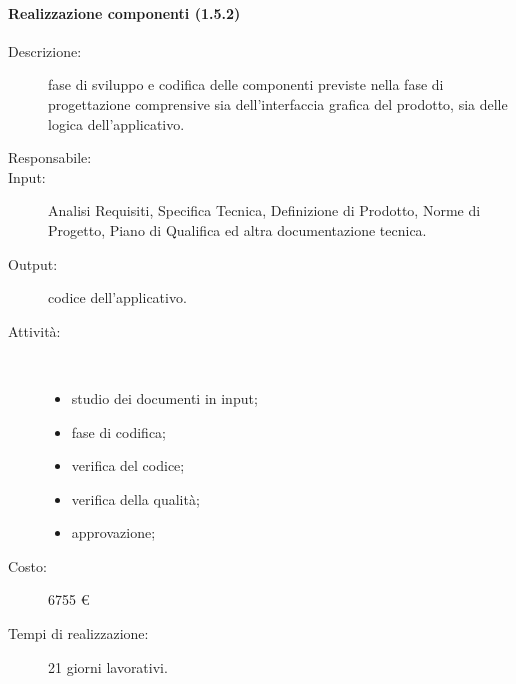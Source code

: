 \begin{description}
\paragraph{Realizzazione componenti (1.5.2)}
\begin{description}
\item[Descrizione:] fase di sviluppo e codifica delle componenti previste nella fase di progettazione comprensive sia dell'interfaccia grafica del prodotto, sia delle logica dell'applicativo.
\item[Responsabile:] 
\item[Input:] Analisi Requisiti, Specifica Tecnica, Definizione di Prodotto, Norme di Progetto, Piano di Qualifica ed altra documentazione tecnica.
\item[Output:] codice dell'applicativo.
\item[Attività:]\mbox{}\\[-1.5\baselineskip]
	\begin{itemize}
	\item studio dei documenti in input;
	\item fase di codifica;
	\item verifica del codice;
	\item verifica della qualit\`{a};
	\item approvazione;
	\end{itemize}
\item[Costo:] 6755 \euro{}
\item[Tempi di realizzazione:] 21 giorni lavorativi.
\end{description}


\end{description}
